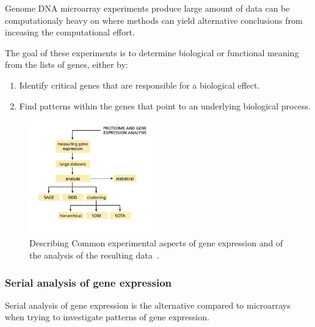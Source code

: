 \documentclass[]{final_report}
\begin{document}
Genome DNA microarray experiments produce large amount of data can be computationaly heavy on where methods can yield alternative conclusions from inceasing the computational effort.

The goal of these experiments is to determine biological or functional meaning from the lists of genes, either by:

\begin{enumerate}
    \item Identify critical genes that are responsible for a biological effect.
    \item Find patterns within the genes that point to an underlying biological process.
\end{enumerate}
\cite{zvelebil_understanding_2008}

\begin{figure}[ht]
    \centering
    \includegraphics[width=0.5\textwidth]{Gene Expresion.png}
    \caption{\label{fig:Gene Expression}Describing Common experimental aspects of gene expression and of the analysis of the resulting data~\cite{zvelebil_understanding_2008}.}
\end{figure}

\clearpage

\subsubsection{Serial analysis of gene expression}

Serial analysis of gene expression is the alternative compared to microarrays when trying to investigate patterns of gene expression.
\end{document}
